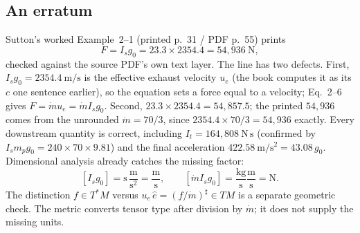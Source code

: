 \subsection{An erratum}
Sutton's worked Example~2--1 (printed p.~31 / PDF p.~55) prints
\[
 F=I_sg_0=23.3\times2354.4=54{,}936\ \mathrm{N},
\]
checked against the source PDF's own text layer. The line has two defects.
First, $I_sg_0=2354.4\ \mathrm{m/s}$ is the effective exhaust velocity $u_e$
(the book computes it as its $c$ one sentence earlier), so the equation sets
a force equal to a velocity; Eq.~2--6 gives $F=\dot mu_e=\dot mI_sg_0$. Second,
$23.3\times2354.4=54{,}857.5$; the printed $54{,}936$ comes from the
unrounded $\dot m=70/3$, since $2354.4\times70/3=54{,}936$ exactly. Every
downstream quantity is correct, including $I_t=164{,}808\ \mathrm{N\,s}$
(confirmed by $I_sm_pg_0=240\times70\times9.81$) and the final acceleration
$422.58\ \mathrm{m/s^2}=43.08\,g_0$. Dimensional analysis already catches
the missing factor:
\[
 [I_sg_0]=\mathrm{s}\,\frac{\mathrm{m}}{\mathrm{s^2}}
        =\frac{\mathrm{m}}{\mathrm{s}},\qquad
 [\dot m I_sg_0]=\frac{\mathrm{kg}}{\mathrm{s}}
                  \frac{\mathrm{m}}{\mathrm{s}}=\mathrm{N}.
\]
The distinction $f\in T^*M$ versus $u_e\,\hat e=(f/\dot m)^\sharp\in TM$ is a
separate geometric check. The metric converts tensor type after division
by $\dot m$; it does not supply the missing units.
